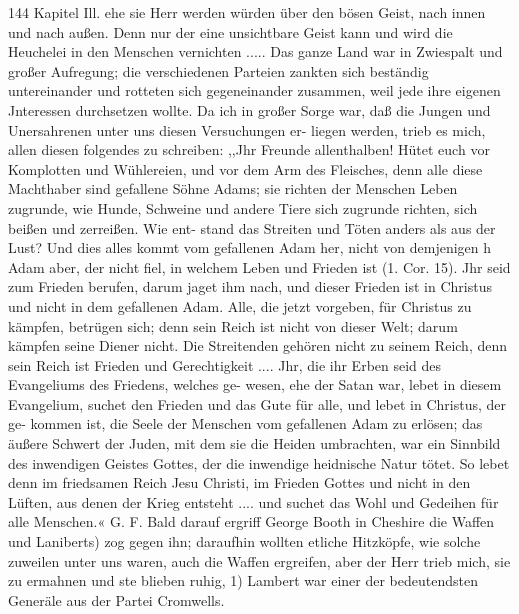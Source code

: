 144 Kapitel Ill.
ehe sie Herr werden würden über den bösen Geist, nach innen
und nach außen. Denn nur der eine unsichtbare Geist kann und
wird die Heuchelei in den Menschen vernichten .....
Das ganze Land war in Zwiespalt und großer Aufregung;
die verschiedenen Parteien zankten sich beständig untereinander
und rotteten sich gegeneinander zusammen, weil jede ihre eigenen
Jnteressen durchsetzen wollte. Da ich in großer Sorge war, daß
die Jungen und Unersahrenen unter uns diesen Versuchungen er-
liegen werden, trieb es mich, allen diesen folgendes zu schreiben:
,,Jhr Freunde allenthalben! Hütet euch vor Komplotten
und Wühlereien, und vor dem Arm des Fleisches, denn alle
diese Machthaber sind gefallene Söhne Adams; sie richten der
Menschen Leben zugrunde, wie Hunde, Schweine und andere
Tiere sich zugrunde richten, sich beißen und zerreißen. Wie ent-
stand das Streiten und Töten anders als aus der Lust? Und
dies alles kommt vom gefallenen Adam her, nicht von demjenigen h
Adam aber, der nicht fiel, in welchem Leben und Frieden ist
(1. Cor. 15). Jhr seid zum Frieden berufen, darum jaget ihm
nach, und dieser Frieden ist in Christus und nicht in dem gefallenen
Adam. Alle, die jetzt vorgeben, für Christus zu kämpfen, betrügen
sich; denn sein Reich ist nicht von dieser Welt; darum kämpfen
seine Diener nicht. Die Streitenden gehören nicht zu seinem
Reich, denn sein Reich ist Frieden und Gerechtigkeit .... Jhr,
die ihr Erben seid des Evangeliums des Friedens, welches ge-
wesen, ehe der Satan war, lebet in diesem Evangelium, suchet den
Frieden und das Gute für alle, und lebet in Christus, der ge-
kommen ist, die Seele der Menschen vom gefallenen Adam zu
erlösen; das äußere Schwert der Juden, mit dem sie die Heiden
umbrachten, war ein Sinnbild des inwendigen Geistes Gottes,
der die inwendige heidnische Natur tötet. So lebet denn im
friedsamen Reich Jesu Christi, im Frieden Gottes und nicht in
den Lüften, aus denen der Krieg entsteht .... und suchet das
Wohl und Gedeihen für alle Menschen.« G. F.
Bald darauf ergriff George Booth in Cheshire die Waffen
und Laniberts) zog gegen ihn; daraufhin wollten etliche Hitzköpfe,
wie solche zuweilen unter uns waren, auch die Waffen ergreifen,
aber der Herr trieb mich, sie zu ermahnen und ste blieben ruhig,
1) Lambert war einer der bedeutendsten Generäle aus der Partei Cromwells.


